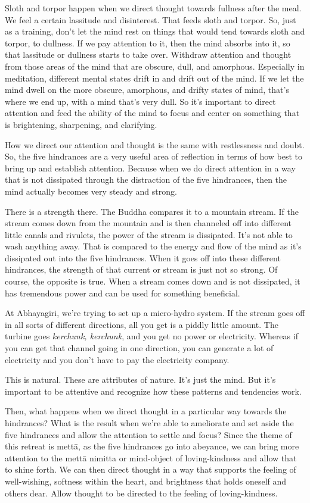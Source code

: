 Sloth and torpor happen when we direct thought towards fullness after
the meal. We feel a certain lassitude and disinterest. That feeds sloth
and torpor. So, just as a training, don’t let the mind rest on things
that would tend towards sloth and torpor, to dullness. If we pay
attention to it, then the mind absorbs into it, so that lassitude or
dullness starts to take over. Withdraw attention and thought from those
areas of the mind that are obscure, dull, and amorphous. Especially in
meditation, different mental states drift in and drift out of the mind.
If we let the mind dwell on the more obscure, amorphous, and drifty
states of mind, that’s where we end up, with a mind that’s very dull. So
it’s important to direct attention and feed the ability of the mind to
focus and center on something that is brightening, sharpening, and
clarifying.

How we direct our attention and thought is the same with restlessness
and doubt. So, the five hindrances are a very useful area of reflection
in terms of how best to bring up and establish attention. Because when
we do direct attention in a way that is not dissipated through the
distraction of the five hindrances, then the mind actually becomes very
steady and strong.

There is a strength there. The Buddha compares it to a mountain stream.
If the stream comes down from the mountain and is then channeled off
into different little canals and rivulets, the power of the stream is
dissipated. It’s not able to wash anything away. That is compared to the
energy and flow of the mind as it’s dissipated out into the five
hindrances. When it goes off into these different hindrances, the
strength of that current or stream is just not so strong. Of course, the
opposite is true. When a stream comes down and is not dissipated, it has
tremendous power and can be used for something beneficial.

At Abhayagiri, we’re trying to set up a micro-hydro system. If the
stream goes off in all sorts of different directions, all you get is a
piddly little amount. The turbine goes \emph{kerchunk, kerchunk}, and
you get no power or electricity. Whereas if you can get that channel
going in one direction, you can generate a lot of electricity and you
don’t have to pay the electricity company.

This is natural. These are attributes of nature. It’s just the mind. But
it’s important to be attentive and recognize how these patterns and
tendencies work.

Then, what happens when we direct thought in a particular way towards
the hindrances? What is the result when we’re able to ameliorate and set
aside the five hindrances and allow the attention to settle and focus?
Since the theme of this retreat is mettā, as the five hindrances go into
abeyance, we can bring more attention to the mettā nimitta or
mind-object of loving-kindness and allow that to shine forth. We can
then direct thought in a way that supports the feeling of well-wishing,
softness within the heart, and brightness that holds oneself and others
dear. Allow thought to be directed to the feeling of loving-kindness.

